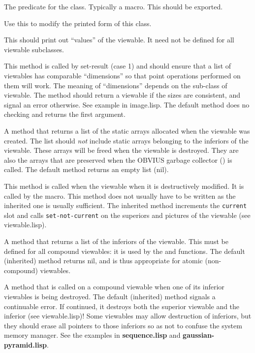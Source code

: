 \begin{description}
\item{}
The predicate for the class.  Typically a macro.  This should be exported.

\item{}
Use this to modify the printed form of this class.

\item{}
This should print out ``values'' of the viewable.  It need not be
defined for all viewable subclasses.

\item{}
This method is called by set-result (case 1) and should ensure
that a list of viewables has comparable ``dimensions'' so that point
operations performed on them will work.  The meaning of ``dimensions''
depends on the sub-class of viewable.  The method should return a
viewable if the sizes are consistent, and signal an error otherwise.
See example in image.lisp.  The default method does no checking and
returns the first argument.

\item{}
A method that returns a list of the static arrays allocated when the
viewable was created.  The list should {\em not} include static arrays
belonging to the inferiors of the viewable.  These arrays will be
freed when the viewable is destroyed.  They are also the arrays that
are preserved when the OBVIUS garbage collector () is
called.  The default method returns an empty list (nil).

\item{}
This method is called when the viewable when it is destructively
modified.  It is called by the  macro.  This method
does not usually have to be written as the inherited one is usually
sufficient.  The inherited method increments the {\tt current} slot
and calls {\tt set-not-current} on the superiors and pictures of the
viewable (see viewable.lisp).

\item{}
A method that returns a list of the inferiors of the viewable.  This
must be defined for all compound viewables: it is used by the
 and  functions. The default (inherited)
method returns nil, and is thus appropriate for atomic (non-compound)
viewables.

\item{}
A method that is called on a compound viewable when one of its
inferior viewables is being destroyed.  The default (inherited) method
signals a continuable error.  If continued, it destroys both the
superior viewable and the inferior (see viewable.lisp)!  Some
viewables may allow destruction of inferiors, but they should erase
all pointers to those inferiors so as not to confuse the system memory
manager.  See the examples in {\bf sequence.lisp} and {\bf
gaussian-pyramid.lisp}.


\end{description}
